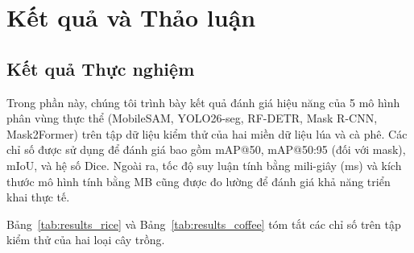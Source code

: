 \section{Kết quả và Thảo luận}

\subsection{Kết quả Thực nghiệm}
Trong phần này, chúng tôi trình bày kết quả đánh giá hiệu năng của 5 mô hình phân vùng thực thể (MobileSAM, YOLO26-seg, RF-DETR, Mask R-CNN, Mask2Former) trên tập dữ liệu kiểm thử của hai miền dữ liệu lúa và cà phê. Các chỉ số được sử dụng để đánh giá bao gồm mAP@50, mAP@50:95 (đối với mask), mIoU, và hệ số Dice. Ngoài ra, tốc độ suy luận tính bằng mili-giây (ms) và kích thước mô hình tính bằng MB cũng được đo lường để đánh giá khả năng triển khai thực tế.

Bảng~\ref{tab:results_rice} và Bảng~\ref{tab:results_coffee} tóm tắt các chỉ số trên tập kiểm thử của hai loại cây trồng.

\begin{table}[H]
  \centering
  \caption{So sánh hiệu năng của các mô hình trên tập dữ liệu Lúa (Rice)}
  \label{tab:results_rice}
\end{table}

